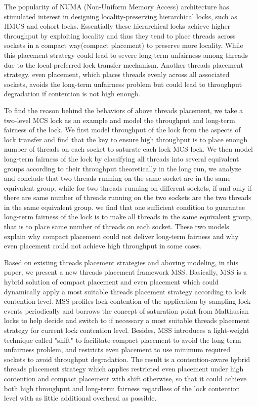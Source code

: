 \begin{englishabstract}
The popularity of NUMA (Non-Uniform Memory Access) architecture has stimulated interest in designing locality-preserving hierarchical locks, such as HMCS and cohort locks. Essentially these hierarchical locks achieve higher throughput by exploiting locality and thus they tend to place threads across sockets in a compact way(compact placement) to preserve more locality. While this placement strategy could lead to severe long-term unfairness among threads due to the local-preferred lock transfer mechanism. Another threads placement strategy, even placement, which places threads evenly across all associated sockets, avoids the long-term unfairness problem but could lead to throughput degradation if contention is not high enough.

To find the reason behind the behaviors of above threads placement, we take a two-level MCS lock as an example and model the throughput and long-term fairness of the lock. We first model throughput of the lock from the aspects of lock transfer and find that the key to ensure high throughput is to place enough number of threads on each socket to saturate each lock MCS lock. We then model long-term fairness of the lock by classifying all threads into several equivalent groups according to their throughput theoretically in the long run, we analyze and conclude that two threads running on the same socket are in the same equivalent group, while for two threads running on different sockets, if and only if there are same number of threads running on the two sockets are the two threads in the same equivalent group. we find that one sufficient condition to guarantee long-term fairness of the lock is to make all threads in the same equivalent group, that is to place same number of threads on each socket. These two models explain why compact placement could not deliver long-term fairness and why even placement could not achieve high throughput in some cases.

Based on existing threads placement strategies and aboving modeling, in this paper, we present a new threads placement framework MSS. Basically, MSS is a hybrid solution of compact placement and even placement which could dynamically apply a most suitable threads placement strategy according to lock contention level. MSS profiles lock contention of the application by sampling lock events periodically and borrows the concept of saturation point from Malthusian locks to help decide and switch to if necessary a most suitable threads placement strategy for current lock contention level. Besides, MSS introduces a light-weight technique called "shift" to facilitate compact placement to avoid the long-term unfairness problem, and restricts even placement to use minimum required sockets to avoid throughput degradation. The result is a contention-aware hybrid threads placement strategy which applies restricted even placement under high contention and compact placement with shift otherwise, so that it could achieve both high throughput and long-term fairness regardless of the lock contention level with as little additional overhead as possible.

\end{englishabstract}

